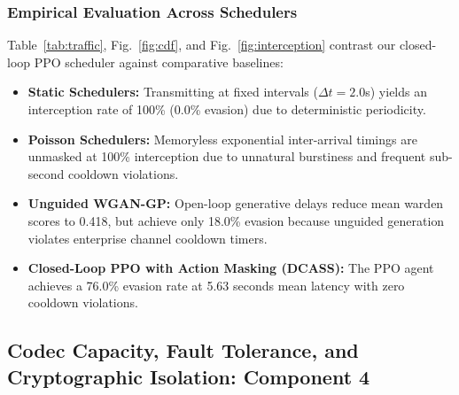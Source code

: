 \documentclass[conference]{IEEEtran}
\begin{document}
\subsubsection{Empirical Evaluation Across Schedulers}
Table~\ref{tab:traffic}, Fig.~\ref{fig:cdf}, and Fig.~\ref{fig:interception} contrast our closed-loop PPO scheduler against comparative baselines:
\begin{itemize}
    \item \textbf{Static Schedulers:} Transmitting at fixed intervals ($\Delta t = 2.0$s) yields an interception rate of 100\% (0.0\% evasion) due to deterministic periodicity.
    \item \textbf{Poisson Schedulers:} Memoryless exponential inter-arrival timings are unmasked at 100\% interception due to unnatural burstiness and frequent sub-second cooldown violations.
    \item \textbf{Unguided WGAN-GP:} Open-loop generative delays reduce mean warden scores to 0.418, but achieve only 18.0\% evasion because unguided generation violates enterprise channel cooldown timers.
    \item \textbf{Closed-Loop PPO with Action Masking (DCASS):} The PPO agent achieves a 76.0\% evasion rate at 5.63 seconds mean latency with zero cooldown violations.
\end{itemize}

\begin{table}[t]
\caption{Network Traffic Evasion Against Calibrated Warden Sequence Detector ($N = 100$ Evaluation Sessions)}
\label{tab:traffic}
\centering
{}
\end{table}

\subsection{Codec Capacity, Fault Tolerance, and Cryptographic Isolation: Component 4}
\end{document}
